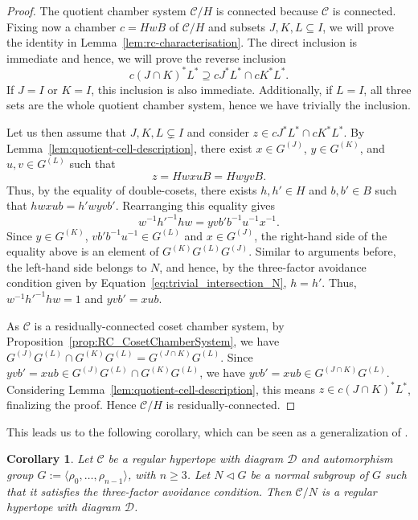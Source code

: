 \documentclass[11pt,letterpaper]{amsart}
\newtheorem{coro}[prop]{Corollary}
\newcommand{\CC}{\mathcal{C}}
\newcommand{\D}{\mathcal{D}}
\newcommand{\C}{\mathcal{C}}
\newcounter{hw}
\begin{document}
\begin{proof}
The quotient chamber system $\C/H$ is connected because $\C$ is connected.  Fixing now a chamber
$c=HwB$ of $\CC/H$ and subsets $J,K,L\subseteq I$,  we will prove the identity in
Lemma~\ref{lem:rc-characterisation}.
The direct inclusion is immediate and hence, we will prove the reverse inclusion
\[
    c(J\cap K)^*L^*\supseteq cJ^*L^*\cap cK^*L^*.
\]
 If $J=I$ or $K=I$, this inclusion is also immediate.  Additionally, if
$L=I$, all three sets are the whole quotient chamber system, hence we have trivially the inclusion. 

Let us then assume that $J,K,L\subsetneq I$ and consider $z\in cJ^*L^*\cap cK^*L^*$.  By
Lemma~\ref{lem:quotient-cell-description}, there exist
$x\in G^{(J)}$, $y\in G^{(K)}$, and $u,v\in G^{(L)}$
such that
\[
    z=HwxuB=HwyvB.
\]
Thus, by the equality of double-cosets, there exists $h,h'\in H$ and $b,b'\in B$ such that
$hwxub=h'wyvb'.$
Rearranging this equality gives
\begin{equation*}
    w^{-1}h'^{-1}hw=yvb'b^{-1}u^{-1}x^{-1}.
\end{equation*}
Since $y\in G^{(K)}$, $vb'b^{-1}u^{-1}\in G^{(L)}$ and $x\in G^{(J)}$, the right-hand side of the 
equality above is an element of
$G^{(K)}G^{(L)}G^{(J)}$. Similar to arguments before, the left-hand side belongs to $N$, and hence, by the three-factor avoidance condition given by Equation~\eqref{eq:trivial_intersection_N},
$h=h'$. Thus, $w^{-1}h'^{-1}hw=1$ and $yvb'= xub$.

As $\C$ is a residually-connected coset chamber system, by Proposition~\ref{prop:RC_CosetChamberSystem}, we have $G^{(J)}G^{(L)} \cap G^{(K)}G^{(L)} =G^{(J\cap K)}G^{(L)}$. Since $yvb'=xub\in G^{(J)}G^{(L)} \cap G^{(K)}G^{(L)}$, we have $yvb'=xub\in G^{(J\cap K)}G^{(L)}$.
Considering Lemma~\ref{lem:quotient-cell-description}, this means $z\in c(J\cap K)^*L^*$, finalizing the proof.
Hence $\CC/H$ is
residually-connected.
\end{proof}



This leads us to the following corollary, which can be seen as a generalization of \cite[Theorem 3.2]{fernandes2020exploration}.
\begin{coro}
Let $\C$ be a regular hypertope with diagram $\D$ and automorphism group $G := \langle \rho_0,\ldots,\rho_{n-1}\rangle$, with $n\geq 3$. Let $N\triangleleft G$ be a normal subgroup of $G$ such that it satisfies the three-factor avoidance condition. Then $\C/N$ is a regular hypertope with diagram $\D$.
\end{coro}
\end{document}
